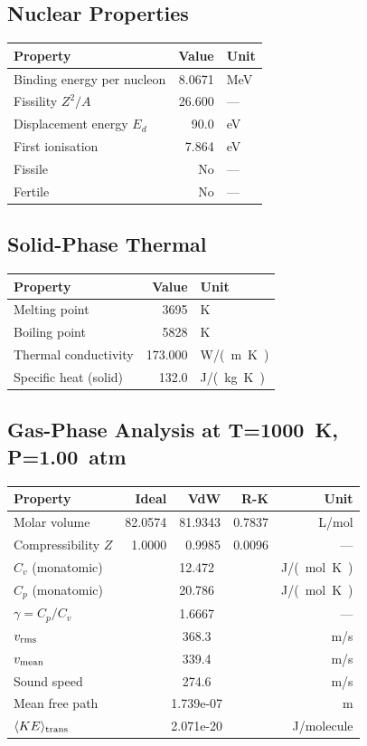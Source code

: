 \documentclass[11pt,a4paper]{article}
\begin{document}
\subsection{Nuclear Properties}
\begin{tabular}{lrl}
  \toprule
  Property & Value & Unit \\
  \midrule
  Binding energy per nucleon & 8.0671 & \si{MeV} \\
  Fissility $Z^2/A$ & 26.600 & --- \\
  Displacement energy $E_d$ & 90.0 & \si{eV} \\
  First ionisation & 7.864 & \si{eV} \\
  Fissile & No & --- \\
  Fertile & No & --- \\
  \bottomrule
\end{tabular}

\subsection{Solid-Phase Thermal}
\begin{tabular}{lrl}
  \toprule
  Property & Value & Unit \\
  \midrule
  Melting point & 3695 & \si{K} \\
  Boiling point & 5828 & \si{K} \\
  Thermal conductivity & 173.000 & \si{W/(m.K)} \\
  Specific heat (solid) & 132.0 & \si{J/(kg.K)} \\
  \bottomrule
\end{tabular}

\subsection{Gas-Phase Analysis at T=\SI{1000}{K}, P=\SI{1.00}{atm}}
\begin{tabular}{lrrrr}
  \toprule
  Property & Ideal & VdW & R-K & Unit \\
  \midrule
  Molar volume & 82.0574 & 81.9343 & 0.7837 & \si{L/mol} \\
  Compressibility $Z$ & 1.0000 & 0.9985 & 0.0096 & --- \\
  \midrule
  $C_v$ (monatomic) & \multicolumn{3}{c}{12.472} & \si{J/(mol.K)} \\
  $C_p$ (monatomic) & \multicolumn{3}{c}{20.786} & \si{J/(mol.K)} \\
  $\gamma = C_p/C_v$ & \multicolumn{3}{c}{1.6667} & --- \\
  $v_{\rm rms}$ & \multicolumn{3}{c}{368.3} & \si{m/s} \\
  $v_{\rm mean}$ & \multicolumn{3}{c}{339.4} & \si{m/s} \\
  Sound speed & \multicolumn{3}{c}{274.6} & \si{m/s} \\
  Mean free path & \multicolumn{3}{c}{1.739e-07} & \si{m} \\
  $\langle KE \rangle_{\rm trans}$ & \multicolumn{3}{c}{2.071e-20} & \si{J/molecule} \\
  \bottomrule
\end{tabular}
\end{document}
